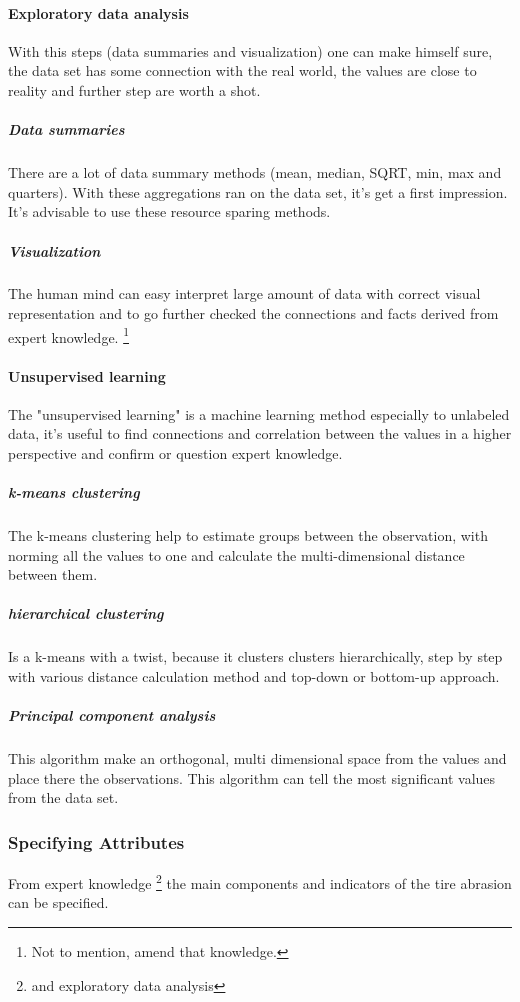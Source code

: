 		\paragraph{Exploratory data analysis}
			With this steps (data summaries and visualization) one can make himself sure, the data set has some connection with the real world, the values are close to reality and further step are worth a shot.
			\subparagraph{Data summaries}
			There are a lot of data summary methods (mean, median, SQRT, min, max and quarters). With these aggregations ran on the data set, it's get a first impression. It's advisable to use these resource sparing methods.
			\subparagraph{Visualization}
			The human mind can easy interpret large amount of data with correct visual representation and to go further checked the connections and facts derived from expert knowledge. \footnote{Not to mention, amend that knowledge.} 
		\paragraph{Unsupervised learning}\cite{UnsuplearnBook}
		The "unsupervised learning" is a machine learning method especially to unlabeled data, it's useful to find connections and correlation between the values in a higher perspective and confirm or question expert knowledge.

		\subparagraph{k-means clustering}
		\cite{k-means}\cite{kmeans2} The k-means clustering help to estimate groups between the observation, with norming all the values to one and calculate the multi-dimensional distance between them.
		\subparagraph{hierarchical clustering}
		\cite{h-clust}\cite{h-clust2}\cite{Clustering} Is a k-means with a twist, because it clusters clusters hierarchically, step by step with various distance calculation method and top-down or bottom-up approach.
		\subparagraph{Principal component analysis}
		\cite{PCA}
		This algorithm make an orthogonal, multi dimensional space from the values and place there the observations. This algorithm can tell the most significant values from the data set.
	\subsubsection{Specifying Attributes}
	From expert knowledge \footnote{and exploratory data analysis} the main components and indicators of the tire abrasion can be specified.

